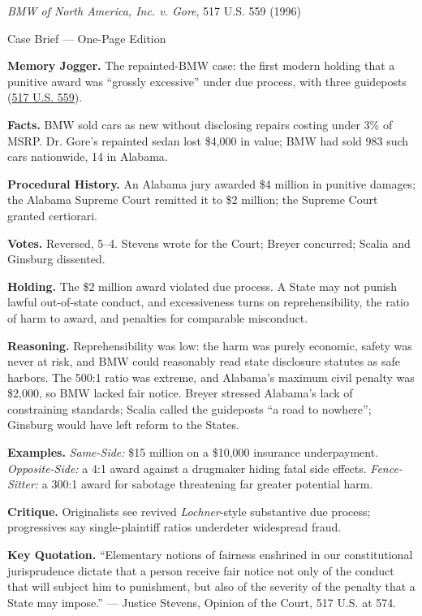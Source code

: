 \documentclass[12pt]{article}
\begin{document}
\begin{center}
{\Large \textit{BMW of North America, Inc. v. Gore}, 517 U.S. 559 (1996)\par}
\vspace{0.3em}
{\normalsize Case Brief --- One-Page Edition\par}
\end{center}

\textbf{Memory Jogger.} The repainted-BMW case: the first modern holding that a punitive award was ``grossly excessive'' under due process, with three guideposts (\href{https://www.courtlistener.com/opinion/118026/bmw-of-north-america-inc-v-gore/}{517 U.S. 559}).

\textbf{Facts.} BMW sold cars as new without disclosing repairs costing under 3\% of MSRP. Dr. Gore's repainted sedan lost \$4,000 in value; BMW had sold 983 such cars nationwide, 14 in Alabama.

\textbf{Procedural History.} An Alabama jury awarded \$4 million in punitive damages; the Alabama Supreme Court remitted it to \$2 million; the Supreme Court granted certiorari.

\textbf{Votes.} Reversed, 5--4. Stevens wrote for the Court; Breyer concurred; Scalia and Ginsburg dissented.

\textbf{Holding.} The \$2 million award violated due process. A State may not punish lawful out-of-state conduct, and excessiveness turns on reprehensibility, the ratio of harm to award, and penalties for comparable misconduct.

\textbf{Reasoning.} Reprehensibility was low: the harm was purely economic, safety was never at risk, and BMW could reasonably read state disclosure statutes as safe harbors. The 500:1 ratio was extreme, and Alabama's maximum civil penalty was \$2,000, so BMW lacked fair notice. Breyer stressed Alabama's lack of constraining standards; Scalia called the guideposts ``a road to nowhere''; Ginsburg would have left reform to the States.

\textbf{Examples.} \emph{Same-Side:} \$15 million on a \$10,000 insurance underpayment. \emph{Opposite-Side:} a 4:1 award against a drugmaker hiding fatal side effects. \emph{Fence-Sitter:} a 300:1 award for sabotage threatening far greater potential harm.

\textbf{Critique.} Originalists see revived \textit{Lochner}-style substantive due process; progressives say single-plaintiff ratios underdeter widespread fraud.

\textbf{Key Quotation.} ``Elementary notions of fairness enshrined in our constitutional jurisprudence dictate that a person receive fair notice not only of the conduct that will subject him to punishment, but also of the severity of the penalty that a State may impose.'' --- Justice Stevens, Opinion of the Court, 517 U.S. at 574.
\end{document}
